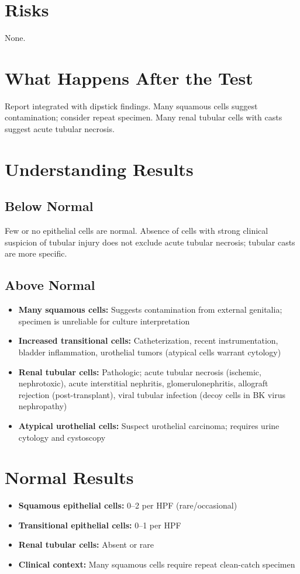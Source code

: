 \section*{Risks}
None.

\section*{What Happens After the Test}
Report integrated with dipstick findings. Many squamous cells suggest contamination; consider repeat specimen. Many renal tubular cells with casts suggest acute tubular necrosis.

\section*{Understanding Results}

\subsection*{Below Normal}
Few or no epithelial cells are normal. Absence of cells with strong clinical suspicion of tubular injury does not exclude acute tubular necrosis; tubular casts are more specific.

\subsection*{Above Normal}
\begin{itemize}
  \item \textbf{Many squamous cells:} Suggests contamination from external genitalia; specimen is unreliable for culture interpretation
  \item \textbf{Increased transitional cells:} Catheterization, recent instrumentation, bladder inflammation, urothelial tumors (atypical cells warrant cytology)
  \item \textbf{Renal tubular cells:} Pathologic; acute tubular necrosis (ischemic, nephrotoxic), acute interstitial nephritis, glomerulonephritis, allograft rejection (post-transplant), viral tubular infection (decoy cells in BK virus nephropathy)
  \item \textbf{Atypical urothelial cells:} Suspect urothelial carcinoma; requires urine cytology and cystoscopy
\end{itemize}

\section*{Normal Results}
\begin{itemize}
  \item \textbf{Squamous epithelial cells:} 0--2 per HPF (rare/occasional)
  \item \textbf{Transitional epithelial cells:} 0--1 per HPF
  \item \textbf{Renal tubular cells:} Absent or rare
  \item \textbf{Clinical context:} Many squamous cells require repeat clean-catch specimen
\end{itemize}

